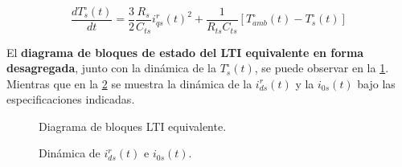 \documentclass[a4paper, 10pt, onecolumn,journal]{ieeeconf}
\begin{document}
\begin{equation}
    \frac{d T^\circ_{s}(t)}{dt} = \frac{3}{2}\frac{R_{s}}{C_{ts}} {i^r_{qs}(t)}^2 + \frac{1}{R_{ts}C_{ts}}\left[T^{\circ}_{amb}(t) - T_{s}^{\circ}(t)\right]
    \label{dinamica sub-sistema térmico}
\end{equation}

El \textbf{diagrama de bloques de estado del LTI equivalente en forma desagregada}, junto con la
dinámica de la $T^{\circ}_s(t)$, se puede observar en la \cref{diagrama de bloques LTI equivalente}. Mientras
que en la \cref{diagrama de bloques LTI equivalente i0s e ids} se muestra la dinámica de la
$i^r_{ds}(t)$ y la $i_{0s}(t)$ bajo las especificaciones indicadas.

\begin{figure}[H]
    \centering
    \begin{adjustbox}{max width=\columnwidth}
    \end{adjustbox}
    \caption{Diagrama de bloques LTI equivalente.}
    \label{diagrama de bloques LTI equivalente}
\end{figure}

\begin{figure}[H]
    \centering
    \begin{adjustbox}{scale=0.8,max width=\columnwidth}
    \end{adjustbox}
    \caption{Dinámica de $i^r_{ds}(t)$ e $i_{0s}(t)$.}
    \label{diagrama de bloques LTI equivalente i0s e ids}
\end{figure}
\end{document}
